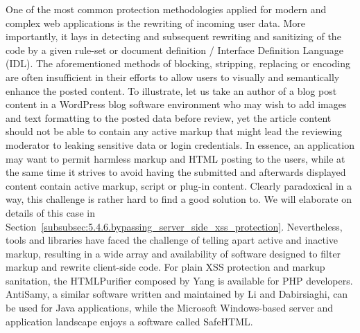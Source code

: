     One of the most common protection methodologies applied for modern and complex web applications is the rewriting of incoming user data. More importantly, it lays in detecting and subsequent rewriting and sanitizing of the code by a given rule-set or document definition / Interface Definition Language (IDL). The aforementioned methods of blocking, stripping, replacing or encoding are often insufficient in their efforts to allow users to visually and semantically enhance the posted content. To illustrate, let us take an author of a blog post content in a WordPress blog software environment who may wish to add images and text formatting to the posted data before review, yet the article content should not be able to contain any active markup that might lead the reviewing moderator to leaking sensitive data or login credentials. In essence, an application may want to permit harmless markup and HTML posting to the users, while at the same time it strives to avoid having the submitted and afterwards displayed 
content contain active markup, script or plug-in content. Clearly paradoxical in a way, this challenge is rather hard to find a good solution to. We will elaborate on details of this case in Section~\ref{subsubsec:5.4.6.bypassing_server_side_xss_protection}. Nevertheless, tools and libraries have faced the challenge of telling apart active and inactive markup, resulting in a wide array and availability of software designed to filter markup and rewrite client-side code. For plain XSS protection and markup sanitation, the HTMLPurifier composed by Yang is available for PHP developers. AntiSamy, a similar software written and maintained by Li and Dabirsiaghi, can be used for Java applications, while the Microsoft Windows-based server and application landscape enjoys a software called SafeHTML.\\

